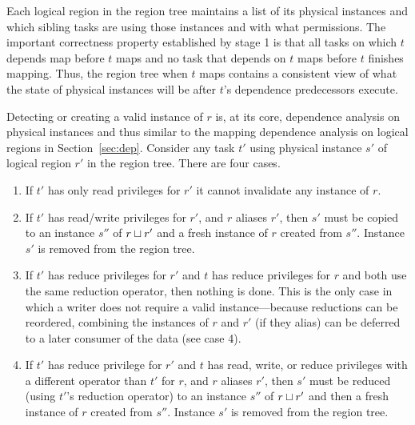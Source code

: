 Each logical region in the region tree maintains a
list of its physical instances and which sibling tasks are using those
instances and with what permissions.  The important correctness
property established by stage 1 is that all
tasks on which $t$ depends map before $t$ maps and no task that depends on
$t$ maps before $t$ finishes mapping.  Thus, the region tree when
$t$ maps contains a consistent view of what the state of physical instances
will be after $t$'s dependence predecessors execute.






Detecting or creating a valid instance of $r$ is, at its core, dependence analysis on
physical instances and thus similar to the mapping dependence analysis on logical
regions in Section~\ref{sec:dep}.  Consider any task $t'$ using
physical instance $s'$ of logical region $r'$ in the region tree.  There are four cases.
\begin{enumerate}
\item If $t'$ has only read privileges
for $r'$ it cannot invalidate any instance of $r$.

\item If $t'$ has read/write privileges for $r'$, and $r$ aliases $r'$,
   then $s'$ must be copied to an instance $s''$ of
  $r \sqcup r'$ and a fresh instance of $r$ created from $s''$.
Instance $s'$ is removed from the region tree.

\item If $t'$ has reduce privileges for $r'$ and $t$ has reduce
  privileges for $r$ and both use the same reduction operator, then
  nothing is done.  This is the only case in which a writer
  does not require a valid instance---because reductions can be
  reordered, combining the instances of $r$ and $r'$ (if they
  alias) can be deferred to a later consumer of the data (see case
  4).

\item If $t'$ has reduce privilege for $r'$ and $t$ has read, write, 
  or reduce privileges with a different operator than $t'$
  for $r$, and $r$ aliases $r'$, then $s'$ must be
  reduced (using $t'$'s reduction operator) to an instance $s''$ of
  $r \sqcup r'$ and then a fresh instance of $r$ created from $s''$.
Instance $s'$ is removed from the region
  tree.
\end{enumerate}


